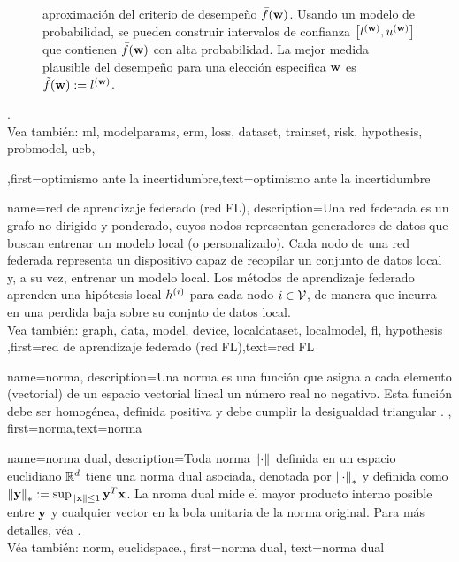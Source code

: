 {{\begin{figure}[H]
\begin{center}
{	aproximación del criterio de desempeño $\bar{f}({\bf w})$. Usando un modelo de probabilidad, se pueden construir intervalos de confianza $\big[ l^{({\bf w})},  u^{({\bf w})} \big]$ 
	que contienen $\bar{f}({\bf w})$ con alta probabilidad. La mejor medida plausible del desempeño para una elección especifica ${\bf w}$ es $\tilde{f}({\bf w}) := l^{({\bf w})}$.} 
	\end{center}
		\end{figure}.
		\\
	 Vea también: \gls{ml}, \gls{modelparams}, \gls{erm}, \gls{loss}, \gls{dataset}, \gls{trainset}, \gls{risk}, \gls{hypothesis}, \gls{probmodel}, \gls{ucb},  },first={optimismo ante la incertidumbre},text={optimismo ante la incertidumbre} 
}

{name={red de aprendizaje federado (red FL)},
	description={Una red federada es un grafo no dirigido y ponderado, 
	cuyos nodos representan generadores de datos que buscan entrenar un modelo local (o personalizado). 
	Cada nodo de una red federada representa un dispositivo capaz de recopilar un conjunto de datos local
	y, a su vez, entrenar un modelo local. 
	Los métodos de aprendizaje federado aprenden una hipótesis local $h^{(i)}$ para
	cada nodo $i \in \mathcal{V}$, de manera que incurra en una perdida baja sobre su conjnto de datos local.
	\\
	 Vea también: \gls{graph},  \gls{data}, \gls{model}, \gls{device}, \gls{localdataset}, \gls{localmodel}, \gls{fl}, \gls{hypothesis}  },first={red de aprendizaje federado (red FL)},text={red FL} 
 }

{name={norma},
	description={Una norma es una función que asigna a cada elemento (vectorial) de un espacio 
		vectorial lineal un número real no negativo. Esta función debe ser homogénea, definida positiva y debe 
		cumplir la desigualdad triangular \cite{HornMatAnalysis}. },
	first={norma},text={norma} 
}

{name={norma dual},
description={Toda norma $\left\Vert {\cdot} \right\Vert_{}$ definida en un espacio euclidiano $\mathbb{R}^{d}$ 
		tiene una norma dual asociada, denotada por $\left\Vert {\cdot} \right\Vert_{*}$ y definida como 
		$\left\Vert {{\bf y}} \right\Vert_{*} := \sup_{\Vert {{\bf x}} \Vert{} \le 1} {\bf y}^{T} {\bf x}$. 
		La nroma dual mide el mayor producto interno posible entre ${\bf y}$ y cualquier vector 
		en la bola unitaria de la norma original. Para más detalles, véa 
		\cite[Sec.~A.1.6]{BoydConvexBook}.\\ 
		Véa también: \gls{norm}, \gls{euclidspace}.},
	first={norma dual},
	text={norma dual}
}


